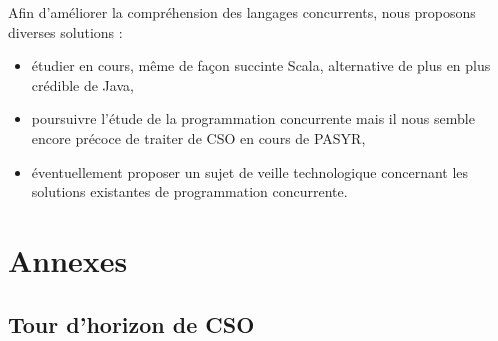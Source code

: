 \documentclass[a4paper,11pt,french]{report}
\begin{document}
Afin d'améliorer la compréhension des langages concurrents, nous proposons diverses solutions :

\begin{itemize}
\item étudier en cours, même de façon succinte Scala, alternative de plus en plus crédible de Java,
\item poursuivre l'étude de la programmation concurrente mais il nous semble encore précoce de traiter de CSO en cours de PASYR,
\item éventuellement proposer un sujet de veille technologique concernant les solutions existantes de programmation concurrente.
\end{itemize}


\part{Annexes}
\appendix
\chapter{ Tour d'horizon de CSO }
\label{chap:cso}
\end{document}
